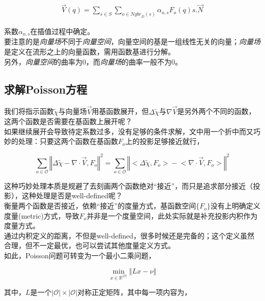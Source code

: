 		\begin{align}
			\overrightarrow{V}(q) = \sum_{s \in S}\sum_{o \in {Ngbr}_D(s)} \alpha_{o,s}F_o(q)s.\overrightarrow{N}
		\end{align}

		系数${\alpha_{o,s}}$在插值过程中确定。\\

		要注意的是\textit{向量场}不同于\textit{向量空间}，向量空间的基是一组线性无关的向量；\textit{向量场}是定义在流形之上的向量函数，需用函数基进行分解。\\

		另外，\textit{向量空间}的曲率为0，而\textit{向量场}的曲率一般不为0。


	\subsection{求解Poisson方程}
		我们将指示函数$\tilde{\chi}$与向量场$\overrightarrow{V}$用基函数展开，但$\Delta{\tilde{\chi}}$与$\nabla \overrightarrow{V}$是另外两个不同的函数，这两个函数是否需要在基函数上展开呢？\\

		如果继续展开会导致待定系数过多，没有足够的条件求解，文中用一个折中而又巧妙的处理：只要这两个函数在基函数${F_o}$上的投影足够接近就行，

		$$
		\sum_{o \in \mathcal{O}}\left\Vert \Delta{\tilde{\chi}} - \nabla\cdot \overrightarrow{V}, F_o \right\Vert^2 
		= 
		\sum_{o \in \mathcal{O}}\left\Vert \big<\Delta{\tilde{\chi}}, F_o\big> 
			- 
			\big<\nabla\cdot \overrightarrow{V}, F_o\big> \right\Vert^2
		$$

		这种巧妙处理本质是规避了去刻画两个函数绝对“接近”，而只是追求部分接近（投影），这种处理是否是well-defined呢？\\

		衡量两个函数是否接近，依赖“接近”的度量方式，基函数空间$\{F_o\}$没有上明确定义度量(metric)方式，导致${F_o}$并非是一个度量空间，此处实际就是补充投影内积作为度量方式。\\

		通过内积定义的距离，不但是well-defined，很多时候还是完备的；这个定义虽然合理，但不一定最优，也可以尝试其他度量定义方式。\\

		如此，Poisson问题可转变为一个最小二乘问题，

		$$
			\min_{x\in \mathbb{R}^{|\mathcal{O}|}} \left\Vert Lx - \nu\right\Vert
		$$

		其中，$L$是一个$|\mathcal{O}| \times |\mathcal{O}|$对称正定矩阵，其中每一项内容为，

